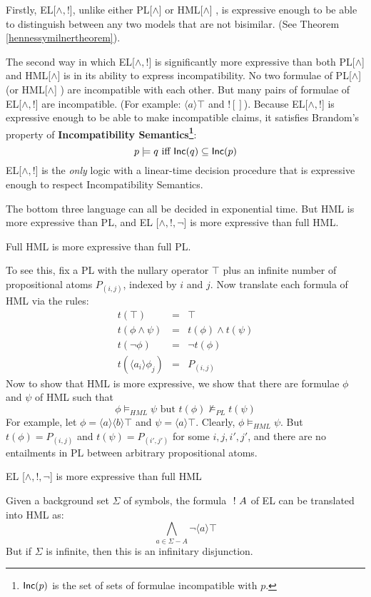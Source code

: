 Firstly, EL[$\land, !$], unlike either PL[$\land$] or HML[$\land$] , is expressive enough to be able to distinguish between any two models that are not bisimilar. (See Theorem \ref{hennessymilnertheorem}).

The second way in which EL[$\land, !$] is significantly more expressive than both PL[$\land$] and HML[$\land$] is in its ability to express incompatibility.
No two formulae of PL[$\land$] (or HML[$\land$] ) are incompatible with each other. 
But many pairs of formulae of EL[$\land, !$] are incompatible.
(For example: $\langle a \rangle \top$ and $! []$). 
Because EL[$\land, !$]  is expressive enough to be able to make incompatible claims, it satisfies Brandom's property of {\bf Incompatibility Semantics\footnote{$\mathsf{Inc}(p)$ is the set of sets of formulae incompatible with $p$.}}:
\[
p \models q \mbox{ iff } \mathsf{Inc}(q) \subseteq \mathsf{Inc}(p)
\]
EL[$\land, !$]  is the \emph{only} logic with a linear-time decision procedure that is expressive enough to respect Incompatibility Semantics.

The bottom three language can all be decided in exponential time.
But HML is more expressive than PL, and EL [$\land, !, \neg$]  is more expressive than full HML. 
\begin{proposition}
Full HML  is more expressive than full PL.
\end{proposition}
To see this, fix a PL with the nullary operator $\top$ plus an infinite number of propositional atoms $P_{(i,j)}$, indexed by $i$ and $j$.
Now translate each formula of HML via the rules:
\begin{eqnarray*}
t(\top)  & = & \top  \\
t(\phi \land \psi) & = & t(\phi) \land t(\psi)  \\
t(\neg \phi) & = & \neg t(\phi)   \\
t(\langle a_i \rangle \phi_j) & = & P_{(i,j)} 
\end{eqnarray*}
Now to show that HML is more expressive, we show that there are formulae $\phi$ and $\psi$ of HML such that
\[
\phi \models_{HML} \psi \mbox{ but } t(\phi) \nvDash_{PL} t(\psi)
\]
For example, let $\phi = \langle a \rangle \langle b \rangle \top$ and $\psi = \langle a \rangle \top$.
Clearly, $\phi \models_{HML} \psi$. But $t(\phi) = P_{(i,j)}$ and $t(\psi) = P_{(i',j')}$ for some $i,j,i',j'$, and there are no entailments in PL between arbitrary propositional atoms.

\begin{proposition}
EL [$\land, !, \neg$]  is more expressive than full HML
\end{proposition}
Given a background set $\Sigma$ of symbols, the formula $\ ! \  A$ of EL can be translated into HML as:
\[
\bigwedge_{a \in \Sigma - A} \neg \langle a \rangle \top
\]
But if $\Sigma$ is infinite, then this is an infinitary disjunction.

